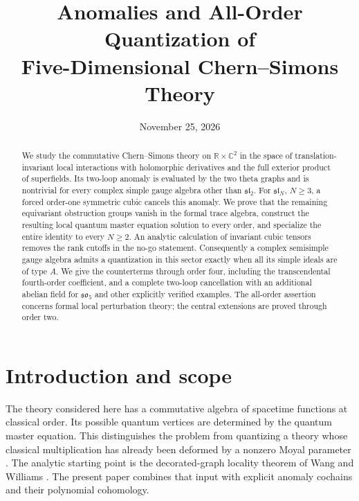 \documentclass[11pt,a4paper]{article}
\title{Anomalies and All-Order Quantization of\\
Five-Dimensional Chern--Simons Theory}
\author{}
\date{November 25, 2026}
\numberwithin{equation}{section}
\theoremstyle{definition}
\theoremstyle{remark}
\begin{document}
\maketitle
\begin{abstract}
We study the commutative Chern--Simons theory on
$\mathbb R\times\mathbb C^2$ in the space of translation-invariant
local interactions with holomorphic derivatives and the full exterior
product of superfields. Its two-loop anomaly is evaluated by the two
theta graphs and is nontrivial for every complex simple gauge algebra
other than $\mathfrak{sl}_2$. For $\mathfrak{sl}_N$, $N\ge3$, a forced
order-one symmetric cubic cancels this anomaly. We prove that the remaining
equivariant obstruction groups vanish in the formal trace algebra,
construct the resulting local quantum master equation solution to
every order, and specialize the entire identity to every $N\ge2$.
An analytic calculation of invariant cubic tensors removes the rank
cutoffs in the no-go statement. Consequently a complex semisimple
gauge algebra admits a quantization in this sector exactly when all
its simple ideals are of type $A$.
We give the counterterms through order four, including the
transcendental fourth-order coefficient, and a complete two-loop
cancellation with an additional abelian field for
$\mathfrak{so}_5$ and other explicitly verified examples.
The all-order assertion concerns formal local perturbation theory;
the central extensions are proved through order two.
\end{abstract}
\tableofcontents

\section{Introduction and scope}

The theory considered here has a commutative algebra of spacetime
functions at classical order. Its possible quantum vertices are
determined by the quantum master equation. This distinguishes the
problem from quantizing a theory whose classical multiplication has
already been deformed by a nonzero Moyal parameter
\cite{CostelloOmega}. The analytic starting point is the decorated-graph
locality theorem of Wang and Williams \cite{WW}. The present paper
combines that input with explicit anomaly cochains and their polynomial
cohomology.
\end{document}
